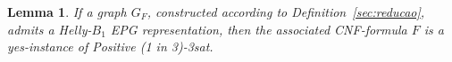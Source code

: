 \documentclass[
submission
]{dmtcs-episciences}
\newtheorem{lemma}[theorem]{Lemma}
\begin{document}
\begin{lemma}\label{lem:volta}
If a graph $G_F$, constructed according to Definition~\ref{sec:reducao}, admits a Helly-$B_1$ EPG representation, then the associated CNF-formula $F$ is a yes-instance of {\sc Positive (1 in 3)-3sat}.
\end{lemma}







\end{document}
